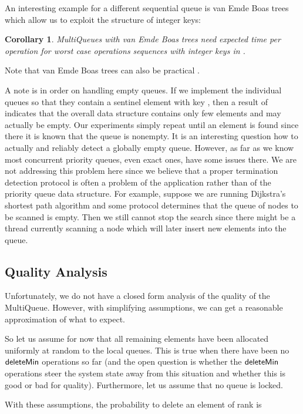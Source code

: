 \documentclass[a4paper,12pt]{article}
\newcommand{\Id}[1]{\ensuremath{\text{{\sf #1}}}}
\newtheorem{corollary}[theorem]{Corollary}
\begin{document}
An interesting example for a different sequential queue is van Emde Boas trees \cite{Emde77}
which allow us to exploit the structure of integer keys:

\begin{corollary}
MultiQueues with van Emde Boas trees need expected time  per operation for worst case operations sequences with integer keys in .
\end{corollary}
Note that van Emde Boas trees can also be practical \cite{DKMS04}.


A note is in order on handling empty queues. If we implement the individual queues so that they contain a sentinel element with key , then a result of  indicates that the overall data structure contains only few elements and may actually be empty. Our experiments simply repeat until an element is found since there it is known that the queue is nonempty. It is an interesting question how to actually and reliably detect a globally empty queue. However, as far as we know most concurrent priority queues, even exact ones, have some issues there. We are not addressing this problem here since we believe that a proper termination detection protocol is often a problem of the application rather than of the priority queue data structure. For example, suppose we are running Dijkstra's shortest path algorithm and some protocol determines that the queue of nodes to be scanned is empty. Then we still cannot stop the search since there might be a thread currently scanning a node which will later insert new elements into the queue.

\subsection{Quality Analysis}\label{ss:analysis}

Unfortunately, we do not have a closed form analysis of the quality of the MultiQueue. However, with simplifying assumptions, we can get a reasonable approximation of what to expect. 

So let us assume for now that all remaining  elements have been allocated uniformly at random to the local queues. This is true when there have been no \Id{deleteMin} operations so far (and the open question is whether the \Id{deleteMin} operations steer the system state away from this situation and whether this is good or bad for quality). Furthermore, let us assume that no queue is locked. 

With these assumptions, the probability to delete an element of rank  is 
\end{document}
